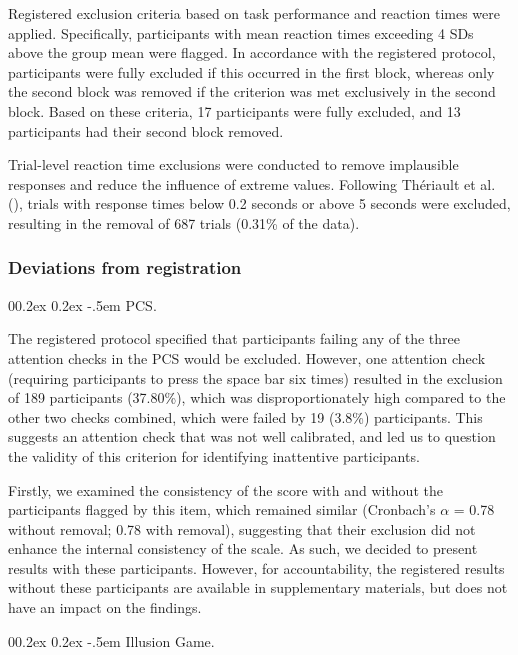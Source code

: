 \documentclass[
  man,
  floatsintext,
  longtable,
  nolmodern,
  notxfonts,
  notimes,
  colorlinks=true,linkcolor=blue,citecolor=blue,urlcolor=blue]{apa7}
\makeatletter
\renewcommand{\paragraph}{\@startsection{paragraph}{4}{\parindent}%
	{0\baselineskip \@plus 0.2ex \@minus 0.2ex}%
	{-.5em}%
	{\normalfont\normalsize\bfseries\typesectitle}}
\makeatother
\begin{document}
Registered exclusion criteria based on task performance and reaction
times were applied. Specifically, participants with mean reaction times
exceeding 4 SDs above the group mean were flagged. In accordance with
the registered protocol, participants were fully excluded if this
occurred in the first block, whereas only the second block was removed
if the criterion was met exclusively in the second block. Based on these
criteria, 17 participants were fully excluded, and 13 participants had
their second block removed.

Trial-level reaction time exclusions were conducted to remove
implausible responses and reduce the influence of extreme values.
Following Thériault et al. (), trials
with response times below 0.2 seconds or above 5 seconds were excluded,
resulting in the removal of 687 trials (0.31\% of the data).

\subsubsection{Deviations from
registration}\label{deviations-from-registration}

\paragraph{PCS.}\label{pcs}

The registered protocol specified that participants failing any of the
three attention checks in the PCS would be excluded. However, one
attention check (requiring participants to press the space bar six
times) resulted in the exclusion of 189 participants (37.80\%), which
was disproportionately high compared to the other two checks combined,
which were failed by 19 (3.8\%) participants. This suggests an attention
check that was not well calibrated, and led us to question the validity
of this criterion for identifying inattentive participants.

Firstly, we examined the consistency of the score with and without the
participants flagged by this item, which remained similar (Cronbach's
\(\alpha\) = 0.78 without removal; 0.78 with removal), suggesting that
their exclusion did not enhance the internal consistency of the scale.
As such, we decided to present results with these participants. However,
for accountability, the registered results without these participants
are available in supplementary materials, but does not have an impact on
the findings.

\paragraph{Illusion Game.}\label{illusion-game-1}
\end{document}
